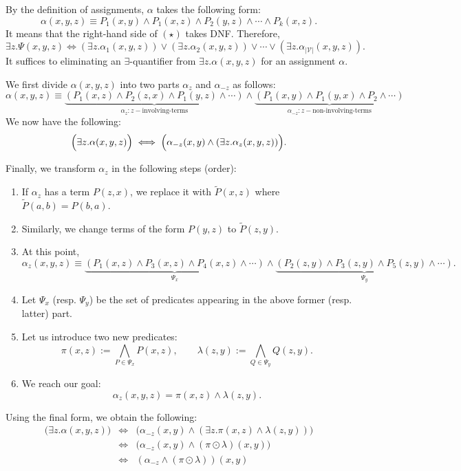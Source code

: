 By the definition of assignments, $\alpha$ takes the following form:
$$
\alpha(x, y, z) \equiv P_1(x, y) \land P_1(x, z) \land P_2(y, z) \land \cdots \land P_k(x, z).
$$
It means that the right-hand side of $(\star)$ takes DNF. Therefore,
$$
\exists z. \Psi(x, y, z) \iff (\exists z. \alpha_1(x, y, z)) \lor (\exists z. \alpha_2(x, y, z)) \lor \cdots \lor (\exists z. \alpha_{|\mathcal{V}|}(x, y, z)).
$$
It suffices to eliminating an $\exists$-quantifier from $\exists z. \alpha(x, y, z)$ for an assignment $\alpha$.

We first divide $\alpha(x, y, z)$ into two parts $\alpha_z$ and $\alpha_{-z}$ as follows:
$$
\alpha(x, y, z) \equiv \underbrace{(P_1(x, z) \land P_2(z, x) \land P_1(y, z) \land \cdots)}_{\alpha_z : z-\text{involving-terms}} \land \underbrace{(P_1(x, y) \land P_1(y, x) \land P_2 \land \cdots)}_{\alpha_{-z} : z-\text{non-involving-terms}}
$$
We now have the following:
$$
\Bigl(\exists z. \alpha(x, y, z)\Bigr) \iff \Bigl(\alpha_{-z}(x, y) \land (\exists z. \alpha_z(x, y, z))\Bigr).
$$

Finally, we transform $\alpha_z$ in the following steps (order):
\begin{enumerate}
\item If $\alpha_z$ has a term $P(z, x)$, we replace it with $\widetilde{P}(x, z)$ where $\widetilde{P}(a, b) = P(b, a)$.
\item Similarly, we change terms of the form $P(y, z)$ to $\widetilde{P}(z, y)$.
\item At this point, 
$$
\alpha_z(x, y, z) \equiv \underbrace{(P_1(x, z) \land P_3(x, z) \land P_4(x, z) \land \cdots)}_{\Psi_x} \land \underbrace{(P_2(z, y) \land P_3(z, y) \land P_5(z, y) \land \cdots)}_{\Psi_y}.
$$
\item Let $\Psi_x$ (resp. $\Psi_y$) be the set of predicates appearing in the above former (resp. latter) part.
\item Let us introduce two new predicates:
$$
\pi(x, z) := \bigwedge_{P \in \Psi_x} P(x, z), \qquad
\lambda(z, y) := \bigwedge_{Q \in \Psi_y} Q(z, y).
$$
\item We reach our goal:
$$
\alpha_z(x, y, z) = \pi(x, z) \land \lambda(z, y).
$$
\end{enumerate}

Using the final form, we obtain the following:
$$
\begin{array}{lcl}
\biggl(\exists z. \alpha(x, y, z)\biggr) & \iff &
\biggl(\alpha_{-z}(x, y) \land (\exists z. \pi(x, z) \land \lambda(z, y))\biggr) \\
& \iff & \biggl(\alpha_{-z}(x, y) \land (\pi \odot \lambda)(x, y)\biggr) \\
& \iff & (\alpha_{-z} \land (\pi \odot \lambda))(x, y)
\end{array}
$$

